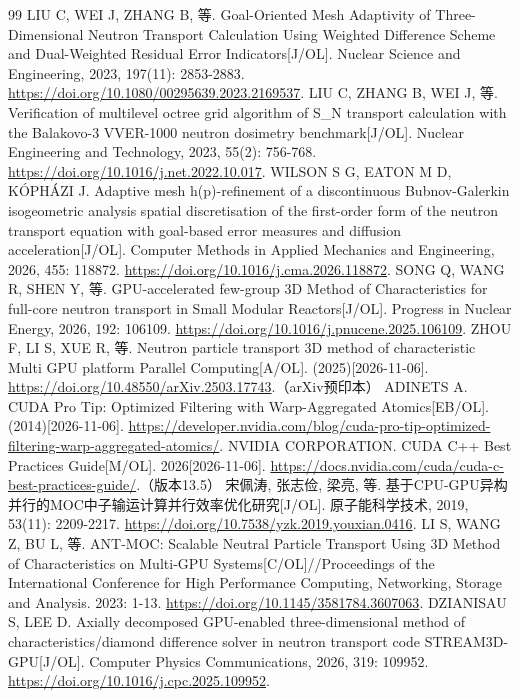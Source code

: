 \documentclass[UTF8, zihao=-4, fontset=none, a4paper]{ctexart}
\begin{document}
\begin{thebibliography}{99}
 LIU C, WEI J, ZHANG B, 等. Goal-Oriented Mesh Adaptivity of Three-Dimensional Neutron Transport Calculation Using Weighted Difference Scheme and Dual-Weighted Residual Error Indicators{[}J/OL{]}. Nuclear Science and Engineering, 2023, 197(11): 2853-2883. \url{https://doi.org/10.1080/00295639.2023.2169537}.
 LIU C, ZHANG B, WEI J, 等. Verification of multilevel octree grid algorithm of S\_N transport calculation with the Balakovo-3 VVER-1000 neutron dosimetry benchmark{[}J/OL{]}. Nuclear Engineering and Technology, 2023, 55(2): 756-768. \url{https://doi.org/10.1016/j.net.2022.10.017}.
 WILSON S G, EATON M D, KÓPHÁZI J. Adaptive mesh h(p)-refinement of a discontinuous Bubnov-Galerkin isogeometric analysis spatial discretisation of the first-order form of the neutron transport equation with goal-based error measures and diffusion acceleration{[}J/OL{]}. Computer Methods in Applied Mechanics and Engineering, 2026, 455: 118872. \url{https://doi.org/10.1016/j.cma.2026.118872}.
 SONG Q, WANG R, SHEN Y, 等. GPU-accelerated few-group 3D Method of Characteristics for full-core neutron transport in Small Modular Reactors{[}J/OL{]}. Progress in Nuclear Energy, 2026, 192: 106109. \url{https://doi.org/10.1016/j.pnucene.2025.106109}.
 ZHOU F, LI S, XUE R, 等. Neutron particle transport 3D method of characteristic Multi GPU platform Parallel Computing{[}A/OL{]}. (2025)[2026-11-06]. \url{https://doi.org/10.48550/arXiv.2503.17743}.（arXiv预印本）
 ADINETS A. CUDA Pro Tip: Optimized Filtering with Warp-Aggregated Atomics{[}EB/OL{]}. (2014)[2026-11-06]. \url{https://developer.nvidia.com/blog/cuda-pro-tip-optimized-filtering-warp-aggregated-atomics/}.
 NVIDIA CORPORATION. CUDA C++ Best Practices Guide{[}M/OL{]}. 2026[2026-11-06]. \url{https://docs.nvidia.com/cuda/cuda-c-best-practices-guide/}.（版本13.5）
 宋佩涛, 张志俭, 梁亮, 等. 基于CPU-GPU异构并行的MOC中子输运计算并行效率优化研究{[}J/OL{]}. 原子能科学技术, 2019, 53(11): 2209-2217. \url{https://doi.org/10.7538/yzk.2019.youxian.0416}.
 LI S, WANG Z, BU L, 等. ANT-MOC: Scalable Neutral Particle Transport Using 3D Method of Characteristics on Multi-GPU Systems{[}C/OL{]}//Proceedings of the International Conference for High Performance Computing, Networking, Storage and Analysis. 2023: 1-13. \url{https://doi.org/10.1145/3581784.3607063}.
 DZIANISAU S, LEE D. Axially decomposed GPU-enabled three-dimensional method of characteristics/diamond difference solver in neutron transport code STREAM3D-GPU{[}J/OL{]}. Computer Physics Communications, 2026, 319: 109952. \url{https://doi.org/10.1016/j.cpc.2025.109952}.

\end{thebibliography}
\end{document}
